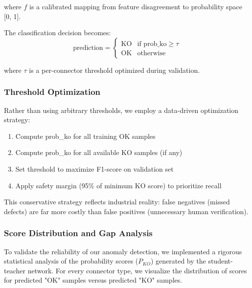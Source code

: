 \documentclass[11pt,a4paper,draft]{article}
\begin{document}
where $f$ is a calibrated mapping from feature disagreement to probability space [0, 1].

The classification decision becomes:
\begin{equation}
\text{prediction} = 
\begin{cases}
\text{KO} & \text{if } \text{prob\_ko} \geq \tau \\
\text{OK} & \text{otherwise}
\end{cases}
\end{equation}

where $\tau$ is a per-connector threshold optimized during validation.

\subsubsection{Threshold Optimization}

Rather than using arbitrary thresholds, we employ a data-driven optimization strategy:

\begin{enumerate}
    \item Compute prob\_ko for all training OK samples
    \item Compute prob\_ko for all available KO samples (if any)
    \item Set threshold to maximize F1-score on validation set
    \item Apply safety margin (95\% of minimum KO score) to prioritize recall
\end{enumerate}

This conservative strategy reflects industrial reality: false negatives (missed defects) are far more costly than false positives (unnecessary human verification).

\subsubsection{Score Distribution and Gap Analysis}

To validate the reliability of our anomaly detection, we implemented a rigorous statistical analysis of the probability scores ($P_{KO}$) generated by the student-teacher network. For every connector type, we visualize the distribution of scores for predicted "OK" samples versus predicted "KO" samples.
\end{document}
